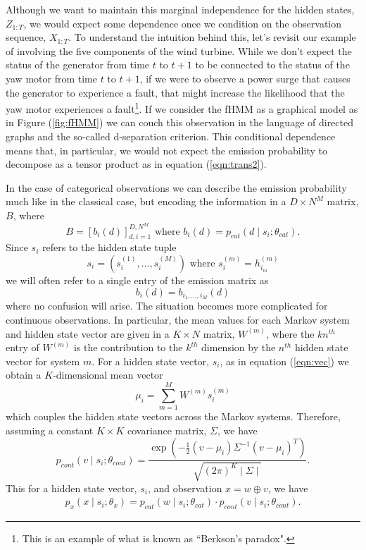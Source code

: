 \documentclass{amsart}
\begin{document}
Although we want to maintain this marginal independence for the hidden states, 
$Z_{1:T}$, we would expect some dependence once we condition on the observation 
sequence, $X_{1:T}$.  To understand the intuition behind this, let's revisit our 
example of involving the five components of the wind turbine.  While we don't 
expect the status of the generator from time $t$ to $t+1$ to be connected to 
the status of the yaw motor from time $t$ to $t+1$, if we were to observe a 
power surge that causes the generator to experience a fault, that might 
increase the likelihood that the yaw motor experiences a fault\footnote{This is 
an example of what is known as ``Berkson's paradox".}.  If we consider 
the fHMM as a graphical model as in Figure (\ref{fig:fHMM}) we can couch this 
observation in the language of directed graphs and the so-called d-separation 
criterion. This conditional dependence means that, in particular, we would not expect the 
emission probability to decompose as a tensor product as in equation (\ref{eqn:trans2}). 

In the case of categorical observations we can 
describe the emission probability much like in the classical case, but encoding 
the information in a $D\times N^M$ matrix, $B$, where 
\[
B = \left[b_{i}(d)\right]_{d,i=1}^{D,N^M} \text{ where }b_{i}(d) = p_{cat}(d\mid 
s_i;\theta_{cat}).
\]
Since $s_i$ refers to the hidden state tuple
\[
s_i = (s_i^{(1)},...,s_i^{(M)}) \text{ where }s_i^{(m)} = h_{i_m}^{(m)}
\]
we will often refer to a single entry of the emission matrix as 
\[
b_{i}(d) = b_{i_1,...,i_M}(d)
\]
where no confusion will arise.  The situation becomes more complicated for continuous observations.  In 
particular, the mean values for each Markov system and hidden state vector are 
given in a $K\times N$ matrix, $W^{(m)}$, where the $kn^{th}$ entry 
of $W^{(m)}$ is the contribution to the $k^{th}$ dimension by the $n^{th}$ 
hidden state vector for system $m$. For a hidden state vector, $s_i$, as in 
equation (\ref{eqn:vec}) we obtain a $K$-dimensional mean vector
\[
\mu_i = \sum_{m=1}^M W^{(m)}s_i^{(m)}
\]
which couples the hidden state vectors across the Markov systems.
Therefore, assuming a constant $K\times K$ covariance matrix, $\Sigma$, we have 
\[
p_{cont}(v\mid s_i;\theta_{cont}) = 
\frac{\exp\left(-\frac{1}{2}\left(v-\mu_i\right)\Sigma^{-1}\left(v-\mu_i\right)^T\right)}{\sqrt{(2\pi)^K\mid \Sigma\mid}}.
\]
This for a hidden state vector, $s_i$, and observation $x=w\oplus v$, we have
\begin{eqnarray}
p_x(x\mid s_i; \theta_x) = p_{cat}(w\mid 
s_i;\theta_{cat})\cdot p_{cont}(v\mid s_i;\theta_{cont}) .
\end{eqnarray}
\end{document}
